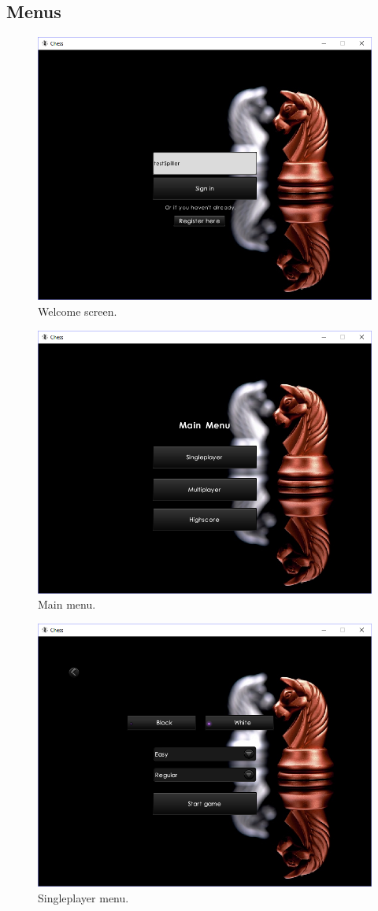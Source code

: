 \documentclass[12pt, a4paper]{article}
\begin{document}
\subsection{Menus}
\begin{figure}[ht!]
	\centering
	\includegraphics[width=0.725\linewidth]{figures/welcome.png}
	\caption{Welcome screen.}
\end{figure}
\begin{figure}[ht!]
	\centering
	\includegraphics[width=0.725\linewidth]{figures/mainmenu.png}
	\caption{Main menu.}
\end{figure}
\begin{figure}[ht!]
	\centering
	\includegraphics[width=0.8\linewidth]{figures/singleplayer.png}
	\caption{Singleplayer menu.}
\end{figure}
\end{document}
